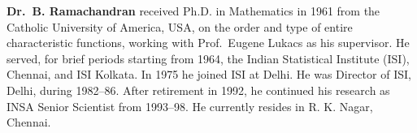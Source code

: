\noindent
{\biofntsize\textbf{Dr.\ B. Ramachandran} received Ph.D. in Mathematics in 1961 from the Catholic University of America, 
USA, on the order and type of entire characteristic functions, working with 
Prof.\ Eugene Lukacs as his supervisor. He served, for brief periods starting from 1964, the Indian 
Statistical Institute (ISI), Chennai, and ISI Kolkata. In 1975 he joined ISI at Delhi. He was Director of 
ISI, Delhi, during 1982--86. After retirement in 1992, he continued his research as INSA Senior Scientist 
from 1993--98. He currently resides in R. K. Nagar, Chennai.}
